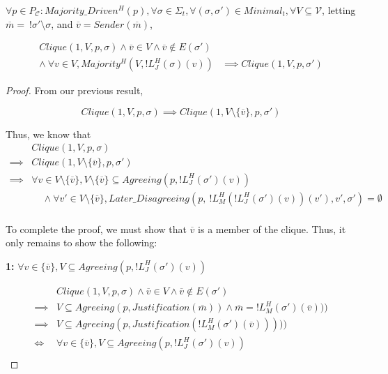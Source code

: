 \begin{lemma}
$\forall p \in P_{\mathcal{C}} : Majority\_Driven^H(p), \forall \sigma \in \Sigma_t, \forall (\sigma, \sigma') \in Minimal_t,\forall V \subseteq \mathcal{V}$, letting $\overline{m} =~!\sigma'\setminus\sigma$, and $\overline{v} = Sender(\overline{m})$,

\begin{align}
Clique(1, V, p, \sigma) \land \overline{v} \in V \land \overline{v} \notin E(\sigma') &\\
\land ~\forall v \in V, Majority^H(V, !L^H_J(\sigma)(v)) & \implies Clique(1, V, p, \sigma')
\end{align}
\end{lemma}

\begin{proof}

From our previous result,

$$
Clique(1, V, p, \sigma) \implies Clique(1, V \setminus \{\overline{v}\}, p, \sigma')
$$


Thus, we know that
\begin{align}
        &Clique(1, V, p, \sigma) \\
\implies&Clique(1, V \setminus \{\overline{v}\}, p, \sigma') \\
\implies&\forall v \in V \setminus \{\overline{v}\}, V \setminus \{\overline{v}\} \subseteq Agreeing(p, !L^H_J(\sigma')(v)) \\
        &~~~~~\land \forall v' \in V \setminus \{\overline{v}\}, Later\_Disagreeing(p,~!L^H_M(!L^H_J(\sigma')(v))(v'), v', \sigma') = \emptyset \\
\end{align}

To complete the proof, we must show that $\overline{v}$ is a member of the clique. Thus, it only remains to show the following:

\textbf{1:} $\forall v \in \{\overline{v}\}, V \subseteq Agreeing(p, !L^H_J(\sigma')(v))$

\begin{align}
          &Clique(1, V, p, \sigma) \land \overline{v} \in V \land \overline{v} \notin E(\sigma') \\
  \implies&V \subseteq Agreeing(p, Justification(\overline{m})) \land \overline{m} = !L^H_M(\sigma')(\overline{v})))\\
  \implies&V \subseteq Agreeing(p, Justification(!L^H_M(\sigma')(\overline{v}))))) \\
  \iff& \forall v \in \{\overline{v}\}, V \subseteq Agreeing(p, !L^H_J(\sigma')(v)) \\
\end{align}


\end{proof}
